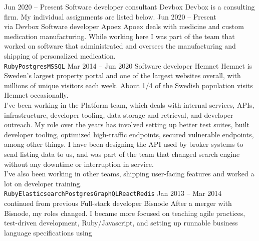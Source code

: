 \documentclass[9pt]{developercv} %
\begin{document}

\pagebreak
{}

\begin{entrylist}
  \entry
    {Jun 2020 -- Present}
    {Software developer consultant}
    {Devbox}
    {Devbox is a consulting firm. My individual assignments are listed below.}
  \entry
    {Jun 2020 -- Present\\\footnotesize{via Devbox}}
    {Software developer}
    {Apoex}
    {Apoex deals with medicine and custom medication manufacturing. While
      working here I was part of the team that worked on software that
      administrated and oversees the manufacturing and shipping of personalized
      medication.\\
      \texttt{Ruby}\slashsep\texttt{Postgres}\slashsep\texttt{MSSQL}}
  \entry
    {Mar 2014 -- Jun 2020}
    {Software developer}
    {Hemnet}
    {Hemnet is Sweden's largest property portal and one of the largest websites
      overall, with millions of unique visitors each week. About 1/4 of the
      Swedish population visits Hemnet occasionally.\\ I've been working in the
      Platform team, which deals with internal services, APIs, infrastructure,
      developer tooling, data storage and retrieval, and developer outreach. My
      role over the years has involved setting up better test suites, built
      developer tooling, optimized high-traffic endpoints, secured vulnerable
      endpoints, among other things. I have been designing the API used by
      broker systems to send listing data to us, and was part of the team that
      changed search engine without any downtime or interruption in service.\\
      I've also been working in other teams, shipping user-facing features and
      worked a lot on developer training.\\
      \texttt{Ruby}\slashsep\texttt{Elasticsearch}\slashsep\texttt{Postgres}\slashsep\texttt{GraphQL}\slashsep\texttt{React}\slashsep\texttt{Redis}}
  \entry
    {Jan 2013 -- Mar 2014\\\footnotesize{continued from previous}}
    {Full-stack developer}
    {Bisnode}
    {After a merger with Bisnode, my roles changed. I became more focused on
      teaching agile practices, test-driven development, Ruby/Javascript, and
      setting up runnable business language specifications using
}
\end{entrylist}
\end{document}
